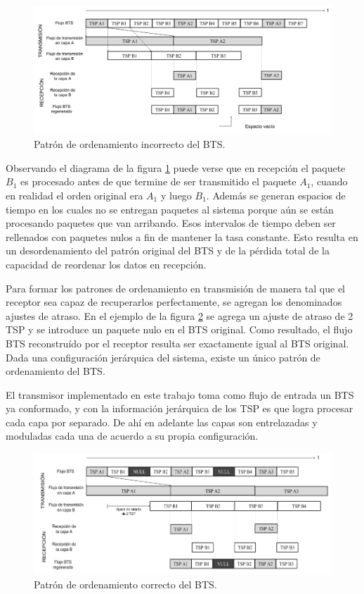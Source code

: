 \begin{figure}[h!]
	\centering
	\includegraphics[scale=0.35]{figuras/cap02/bts1}
	\caption{\label{f:bts1} Patrón de ordenamiento incorrecto del BTS.}
\end{figure} 

Observando el diagrama de la figura \ref{f:bts1} puede verse que en recepción el paquete $B_1$ es procesado antes de que termine de ser transmitido el paquete $A_1$, cuando en realidad el orden original era $A_1$ y luego $B_1$. Además se generan espacios de tiempo en los cuales no se entregan paquetes al sistema porque aún se están procesando paquetes que van arribando. Esos intervalos de tiempo deben ser rellenados con paquetes nulos a fin de mantener la tasa constante. Esto resulta en un desordenamiento del patrón original del BTS y de la pérdida total de la capacidad de reordenar los datos en recepción.

Para formar los patrones de ordenamiento en transmisión de manera tal que el receptor sea capaz de recuperarlos perfectamente, se agregan los denominados ajustes de atraso. En el ejemplo de la figura \ref{f:bts2} se agrega un ajuste de atraso de 2 TSP y se introduce un paquete nulo en el BTS original. Como resultado, el flujo BTS reconstruído por el receptor resulta ser exactamente igual al BTS original. Dada una configuración jerárquica del sistema, existe un único patrón de ordenamiento del BTS.

El transmisor implementado en este trabajo toma como flujo de entrada un BTS ya conformado, y con la información jerárquica de los TSP es que logra procesar cada capa por separado. De ahí en adelante las capas son entrelazadas y moduladas cada una de acuerdo a su propia configuración.

\begin{figure}[h!]
	\centering
	\includegraphics[scale=0.45]{figuras/cap02/bts2}
	\caption{\label{f:bts2} Patrón de ordenamiento correcto del BTS.}
\end{figure}